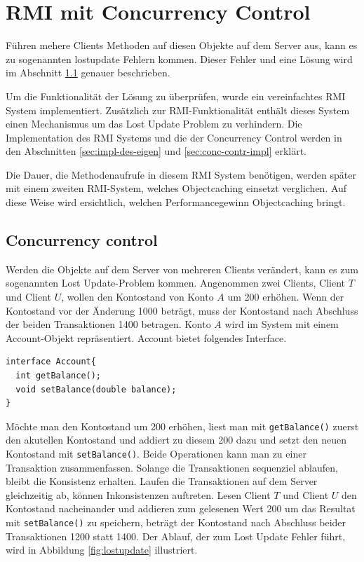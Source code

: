 \chapter{RMI mit Concurrency Control}

Führen mehere Clients Methoden auf diesen Objekte auf dem Server aus,
kann es zu sogenannten \gls{lostupdate} Fehlern kommen. Dieser Fehler  und eine Lösung wird im Abschnitt \ref{sec:concurrency-control}
genauer beschrieben. 

Um die Funktionalität der Lösung zu überprüfen, wurde ein
vereinfachtes RMI System implementiert. Zusätzlich zur
RMI-Funktionalität ent\-hält dies\-es System einen Mechanismus um das Lost
Update Problem zu verhindern. Die Implementation des RMI Systems und
die der Concurrency Control werden in den Abschnitten
\ref{sec:impl-des-eigen} und \ref{sec:conc-contr-impl} erklärt.

Die Dauer, die Methodenaufrufe in diesem RMI System benötigen, werden
später mit einem zweiten RMI-System, welches Objectcaching einsetzt
verglichen. Auf diese Weise wird ersichtlich, welchen
Performancegewinn Objectcaching bringt.


\section{Concurrency control}
\label{sec:concurrency-control}
Werden die Objekte auf dem Server von mehreren Clients verändert, kann
es zum sogenannten Lost Update-Problem kommen. Angenommen zwei
Clients, Client $T$ und Client $U$, wollen den Kontostand von Konto
$A$ um 200 erhöhen. Wenn der Kontostand vor der Änderung 1000 beträgt,
muss der Kontostand nach Abschluss der beiden Transaktionen 1400
betragen. Konto $A$ wird im System mit einem Account-Objekt
repräsentiert. Account bietet folgendes Interface.

\lstset{language=Java}
\begin{lstlisting}
interface Account{
  int getBalance();
  void setBalance(double balance);
}
\end{lstlisting}

Möchte man den Kontostand um 200 erhöhen, liest man mit \newline
\verb|getBalance()| zuerst den akutellen Kontostand und addiert zu
diesem 200 dazu und setzt den neuen Kontostand mit
\verb|setBalance()|. Beide Operationen kann man zu einer Transaktion
zusammenfassen. Solange die Transaktionen sequenziel ablaufen, bleibt die
Konsistenz erhalten. Laufen die Transaktionen auf dem Server
gleichzeitig ab, können Inkonsistenzen auftreten. Lesen Client $T$ und
Client $U$ den Kontostand nacheinander und addieren zum gelesenen Wert
200 um das Resultat mit \verb|setBalance()| zu speichern, beträgt der
Kontostand nach Abschluss beider Transaktionen 1200 statt 1400. Der
Ablauf, der zum Lost Update Fehler führt, wird in Abbildung
\ref{fig:lostupdate} illustriert.

